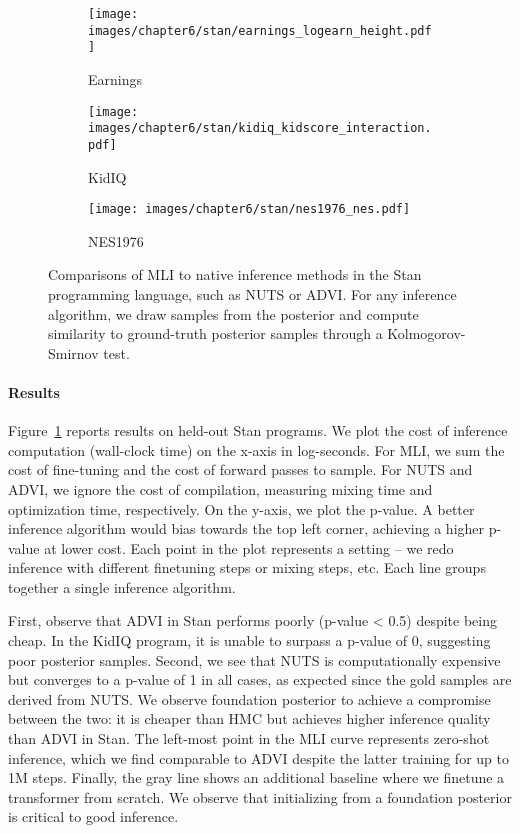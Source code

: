 \begin{figure}[h!]
  \centering
  \begin{subfigure}[b]{0.32\textwidth}
    \centering
    \texttt{[image: images/chapter6/stan/earnings\_logearn\_height.pdf]}
    \caption{Earnings}
  \end{subfigure}
  \hfill
  \begin{subfigure}[b]{0.32\textwidth}
    \centering
    \texttt{[image: images/chapter6/stan/kidiq\_kidscore\_interaction.pdf]}
    \caption{KidIQ}
  \end{subfigure}
  \hfill
  \begin{subfigure}[b]{0.32\textwidth}
    \centering
    \texttt{[image: images/chapter6/stan/nes1976\_nes.pdf]}
    \caption{NES1976}
  \end{subfigure}
\caption{Comparisons of MLI to native inference methods in the Stan programming language, such as NUTS or ADVI. For any inference algorithm, we draw samples from the posterior and compute similarity to ground-truth posterior samples through a Kolmogorov-Smirnov test.}
\label{fig:stan}
\end{figure}

\paragraph{Results} Figure~\ref{fig:stan} reports results on held-out Stan programs. We plot the cost of inference computation (wall-clock time) on the x-axis in log-seconds. For MLI, we sum the cost of fine-tuning and the cost of forward passes to sample. For NUTS and ADVI, we ignore the cost of compilation, measuring mixing time and optimization time, respectively.
On the y-axis, we plot the p-value.
A better inference algorithm would bias towards the top left corner, achieving a higher p-value at lower cost. Each point in the plot represents a setting -- we redo inference with different finetuning steps or mixing steps, etc. Each line groups together a single inference algorithm.

First, observe that ADVI in Stan performs poorly (p-value < 0.5) despite being cheap. In the KidIQ program, it is unable to surpass a p-value of 0, suggesting poor posterior samples. Second, we see that NUTS is computationally expensive but converges to a p-value of 1 in all cases, as expected since the gold samples are derived from NUTS. We observe foundation posterior to achieve a compromise between the two: it is cheaper than HMC but achieves higher inference quality than ADVI in Stan. The left-most point in the MLI curve represents zero-shot inference, which we find comparable to ADVI despite the latter training for up to 1M steps. Finally, the gray line shows an additional baseline where we finetune a transformer from scratch. We observe that initializing from a foundation posterior is critical to good inference.


